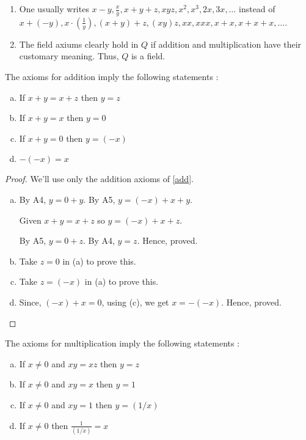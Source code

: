 \begin{rem}
    \begin{enumerate}
        \item One usually writes $ x - y, \frac{x}{y}, x + y + z, xyz, x^2, x^3, 2x, 3x, \dots $ instead of
        $ x + (-y), x \cdot \left( \frac{1}{y} \right), (x+y)+z, (xy)z, xx, xxx, x+x, x+x+x, \dots $.
        \item The field axiums clearly hold in $Q$ if addition and multiplication have their customary meaning.
        Thus, $Q$ is a field.

    \end{enumerate}
    
\end{rem}

\begin{prop}
    \label{addprop}
    The axioms for addition imply the following statements : 
    \begin{enumerate}[a)]
        \item If $x + y = x + z$ then $y = z$
        \item If $x + y = x$ then $y = 0$
        \item If $x + y = 0$ then $y = (-x)$
        \item $-(-x) = x$
    \end{enumerate}
\end{prop}

\begin{proof}
    We'll use only the addition axioms of \ref{add}.
    \begin{enumerate}[a)]
        \item 
            By A4, $y = 0 + y$.         
            By A5, $y = (-x) + x + y$. 

            Given $x + y = x + z$ so $y = (-x) + x + z$. 

            By A5, $y = 0 + z$. By A4, $y = z$. Hence, proved. 
        
        \item Take $z = 0$ in (a) to prove this.
        \item Take $z = (-x)$ in (a) to prove this.
        \item Since, $(-x) + x = 0$, using (c), we get $x = -(-x)$. Hence, proved.
    \end{enumerate}
\end{proof}


\begin{prop}
    \label{mulprop}
    The axioms for multiplication imply the following statements : 
    \begin{enumerate}[a)]
        \item If $x \neq 0$ and $xy = xz$  then $y = z$
        \item If $x \neq 0$ and $xy = x$ then $y = 1$
        \item If $x \neq 0$ and $xy = 1$ then $y = (1/x)$
        \item If $x \neq 0$ then $\frac{1}{(1/x)}= x$
    \end{enumerate}
\end{prop}


